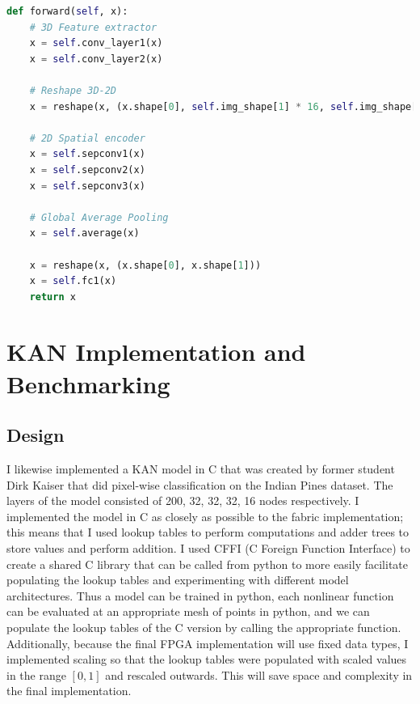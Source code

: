 \documentclass[psamsfonts]{amsart}
\theoremstyle{definition}
\theoremstyle{remark}
\numberwithin{equation}{section}
\begin{document}
\begin{lstlisting}[language=python]
def forward(self, x):
    # 3D Feature extractor
    x = self.conv_layer1(x)
    x = self.conv_layer2(x)

    # Reshape 3D-2D
    x = reshape(x, (x.shape[0], self.img_shape[1] * 16, self.img_shape[2], self.img_shape[3]))

    # 2D Spatial encoder
    x = self.sepconv1(x)
    x = self.sepconv2(x)
    x = self.sepconv3(x)

    # Global Average Pooling
    x = self.average(x)

    x = reshape(x, (x.shape[0], x.shape[1]))
    x = self.fc1(x)
    return x

\end{lstlisting}

\section{KAN Implementation and Benchmarking}
\subsection{Design}
I likewise implemented a KAN model in C that was created by former student Dirk Kaiser that did pixel-wise classification on the Indian Pines dataset. The layers of the model consisted of 200, 32, 32, 32, 16 nodes respectively. I implemented the model in C as closely as possible to the fabric implementation; this means that I used lookup tables to perform computations and adder trees to store values and perform addition. I used CFFI (C Foreign Function Interface) to create a shared C library that can be called from python to more easily facilitate populating the lookup tables and experimenting with different model architectures. Thus a model can be trained in python, each nonlinear function can be evaluated at an appropriate mesh of points in python, and we can populate the lookup tables of the C version by calling the appropriate function. Additionally, because the final FPGA implementation will use fixed data types, I implemented scaling so that the lookup tables were populated with scaled values in the range $[0,1]$ and rescaled outwards. This will save space and complexity in the final implementation.
\end{document}

